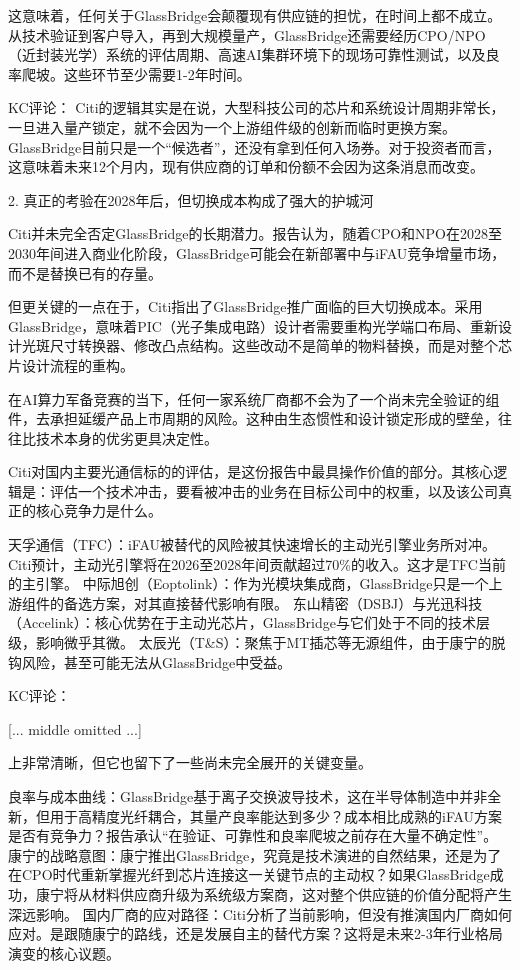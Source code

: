 \documentclass[11pt]{ctexart}
\begin{document}
这意味着，任何关于GlassBridge会颠覆现有供应链的担忧，在时间上都不成立。从技术验证到客户导入，再到大规模量产，GlassBridge还需要经历CPO/NPO（近封装光学）系统的评估周期、高速AI集群环境下的现场可靠性测试，以及良率爬坡。这些环节至少需要1-2年时间。

KC评论： Citi的逻辑其实是在说，大型科技公司的芯片和系统设计周期非常长，一旦进入量产锁定，就不会因为一个上游组件级的创新而临时更换方案。GlassBridge目前只是一个“候选者”，还没有拿到任何入场券。对于投资者而言，这意味着未来12个月内，现有供应商的订单和份额不会因为这条消息而改变。

2. 真正的考验在2028年后，但切换成本构成了强大的护城河

Citi并未完全否定GlassBridge的长期潜力。报告认为，随着CPO和NPO在2028至2030年间进入商业化阶段，GlassBridge可能会在新部署中与iFAU竞争增量市场，而不是替换已有的存量。

但更关键的一点在于，Citi指出了GlassBridge推广面临的巨大切换成本。采用GlassBridge，意味着PIC（光子集成电路）设计者需要重构光学端口布局、重新设计光斑尺寸转换器、修改凸点结构。这些改动不是简单的物料替换，而是对整个芯片设计流程的重构。

在AI算力军备竞赛的当下，任何一家系统厂商都不会为了一个尚未完全验证的组件，去承担延缓产品上市周期的风险。这种由生态惯性和设计锁定形成的壁垒，往往比技术本身的优劣更具决定性。

Citi对国内主要光通信标的的评估，是这份报告中最具操作价值的部分。其核心逻辑是：评估一个技术冲击，要看被冲击的业务在目标公司中的权重，以及该公司真正的核心竞争力是什么。

天孚通信（TFC）：iFAU被替代的风险被其快速增长的主动光引擎业务所对冲。Citi预计，主动光引擎将在2026至2028年间贡献超过70\%的收入。这才是TFC当前的主引擎。 中际旭创（Eoptolink）：作为光模块集成商，GlassBridge只是一个上游组件的备选方案，对其直接替代影响有限。 东山精密（DSBJ）与光迅科技（Accelink）：核心优势在于主动光芯片，GlassBridge与它们处于不同的技术层级，影响微乎其微。 太辰光（T\&S）：聚焦于MT插芯等无源组件，由于康宁的脱钩风险，甚至可能无法从GlassBridge中受益。

KC评论： 

[... middle omitted ...]

上非常清晰，但它也留下了一些尚未完全展开的关键变量。

良率与成本曲线：GlassBridge基于离子交换波导技术，这在半导体制造中并非全新，但用于高精度光纤耦合，其量产良率能达到多少？成本相比成熟的iFAU方案是否有竞争力？报告承认“在验证、可靠性和良率爬坡之前存在大量不确定性”。 康宁的战略意图：康宁推出GlassBridge，究竟是技术演进的自然结果，还是为了在CPO时代重新掌握光纤到芯片连接这一关键节点的主动权？如果GlassBridge成功，康宁将从材料供应商升级为系统级方案商，这对整个供应链的价值分配将产生深远影响。 国内厂商的应对路径：Citi分析了当前影响，但没有推演国内厂商如何应对。是跟随康宁的路线，还是发展自主的替代方案？这将是未来2-3年行业格局演变的核心议题。
\end{document}
